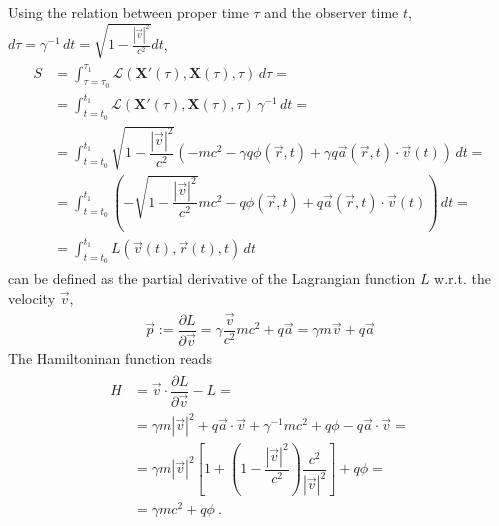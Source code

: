 \documentclass[letterpaper,10pt,english]{jupyterBook}
\begin{document}
\sphinxAtStartPar
{} Using the relation between proper time \(\tau\) and the observer time \(t\), \(d \tau = \gamma^{-1} \, d t = \sqrt{1 - \frac{|\vec{v}|^2}{c^2}} d t\),
\begin{equation*}
\begin{split}\begin{aligned}
  S
  & = \int_{\tau = \tau_0}^{\tau_1} \mathscr{L}\left(\mathbf{X}'(\tau), \mathbf{X}(\tau), \tau \right) \, d \tau = \\
  & = \int_{ t   =  t_0  }^{ t_1  } \mathscr{L}\left(\mathbf{X}'(\tau), \mathbf{X}(\tau), \tau \right) \, \gamma^{-1} \, d t = \\
  & = \int_{ t   =  t_0  }^{ t_1  } \sqrt{1 - \dfrac{|\vec{v}|^2}{c^2}} \left( - m c^2 - \gamma q \phi(\vec{r},t) + \gamma q \vec{a}(\vec{r},t) \cdot \vec{v}(t) \right) \, d t = \\
  & = \int_{ t   =  t_0  }^{ t_1  } \left( - \sqrt{1 - \dfrac{|\vec{v}|^2}{c^2}} m c^2 - q \phi(\vec{r},t) + q \vec{a}(\vec{r},t) \cdot \vec{v}(t) \right) \, d t = \\
  & = \int_{t = t_0}^{t_1} L\left(\vec{v}(t), \vec{r}(t), t \right) \, dt
\end{aligned}\end{split}
\end{equation*}
\sphinxAtStartPar
{} can be defined as the partial derivative of the Lagrangian function \(L\) w.r.t. the velocity \(\vec{v}\),
\begin{equation*}
\begin{split}\vec{p} := \dfrac{\partial L}{\partial \vec{v}} = \gamma \dfrac{\vec{v}}{c^2}  m c^2 + q \vec{a} = \gamma m \vec{v} + q \vec{a}\end{split}
\end{equation*}
\sphinxAtStartPar
The Hamiltoninan function reads
\begin{equation*}
\begin{split}\begin{aligned}
  H
  & = \vec{v} \cdot \dfrac{\partial L}{\partial \vec{v}} - L = \\
  & = \gamma m |\vec{v}|^2 + q \vec{a} \cdot \vec{v} + \gamma^{-1} m c^2 + q \phi - q \vec{a} \cdot \vec{v} = \\
  & = \gamma m |\vec{v}|^2 \left[ 1 + \left( 1 - \dfrac{|\vec{v}|^2}{c^2} \right) \dfrac{c^2}{|\vec{v}|^2} \right] + q \phi = \\
  & = \gamma m c^2 + q \phi \ .
\end{aligned}\end{split}
\end{equation*}
\end{document}
